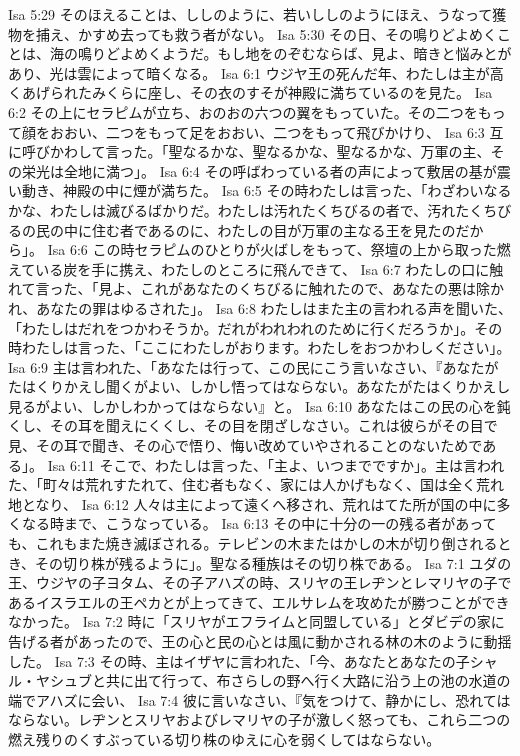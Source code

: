 Isa 5:29  そのほえることは、ししのように、若いししのようにほえ、うなって獲物を捕え、かすめ去っても救う者がない。
Isa 5:30  その日、その鳴りどよめくことは、海の鳴りどよめくようだ。もし地をのぞむならば、見よ、暗きと悩みとがあり、光は雲によって暗くなる。
Isa 6:1  ウジヤ王の死んだ年、わたしは主が高くあげられたみくらに座し、その衣のすそが神殿に満ちているのを見た。
Isa 6:2  その上にセラピムが立ち、おのおの六つの翼をもっていた。その二つをもって顔をおおい、二つをもって足をおおい、二つをもって飛びかけり、
Isa 6:3  互に呼びかわして言った。「聖なるかな、聖なるかな、聖なるかな、万軍の主、その栄光は全地に満つ」。
Isa 6:4  その呼ばわっている者の声によって敷居の基が震い動き、神殿の中に煙が満ちた。
Isa 6:5  その時わたしは言った、「わざわいなるかな、わたしは滅びるばかりだ。わたしは汚れたくちびるの者で、汚れたくちびるの民の中に住む者であるのに、わたしの目が万軍の主なる王を見たのだから」。
Isa 6:6  この時セラピムのひとりが火ばしをもって、祭壇の上から取った燃えている炭を手に携え、わたしのところに飛んできて、
Isa 6:7  わたしの口に触れて言った、「見よ、これがあなたのくちびるに触れたので、あなたの悪は除かれ、あなたの罪はゆるされた」。
Isa 6:8  わたしはまた主の言われる声を聞いた、「わたしはだれをつかわそうか。だれがわれわれのために行くだろうか」。その時わたしは言った、「ここにわたしがおります。わたしをおつかわしください」。
Isa 6:9  主は言われた、「あなたは行って、この民にこう言いなさい、『あなたがたはくりかえし聞くがよい、しかし悟ってはならない。あなたがたはくりかえし見るがよい、しかしわかってはならない』と。
Isa 6:10  あなたはこの民の心を鈍くし、その耳を聞えにくくし、その目を閉ざしなさい。これは彼らがその目で見、その耳で聞き、その心で悟り、悔い改めていやされることのないためである」。
Isa 6:11  そこで、わたしは言った、「主よ、いつまでですか」。主は言われた、「町々は荒れすたれて、住む者もなく、家には人かげもなく、国は全く荒れ地となり、
Isa 6:12  人々は主によって遠くへ移され、荒れはてた所が国の中に多くなる時まで、こうなっている。
Isa 6:13  その中に十分の一の残る者があっても、これもまた焼き滅ぼされる。テレビンの木またはかしの木が切り倒されるとき、その切り株が残るように」。聖なる種族はその切り株である。
Isa 7:1  ユダの王、ウジヤの子ヨタム、その子アハズの時、スリヤの王レヂンとレマリヤの子であるイスラエルの王ペカとが上ってきて、エルサレムを攻めたが勝つことができなかった。
Isa 7:2  時に「スリヤがエフライムと同盟している」とダビデの家に告げる者があったので、王の心と民の心とは風に動かされる林の木のように動揺した。
Isa 7:3  その時、主はイザヤに言われた、「今、あなたとあなたの子シャル・ヤシュブと共に出て行って、布さらしの野へ行く大路に沿う上の池の水道の端でアハズに会い、
Isa 7:4  彼に言いなさい、『気をつけて、静かにし、恐れてはならない。レヂンとスリヤおよびレマリヤの子が激しく怒っても、これら二つの燃え残りのくすぶっている切り株のゆえに心を弱くしてはならない。
